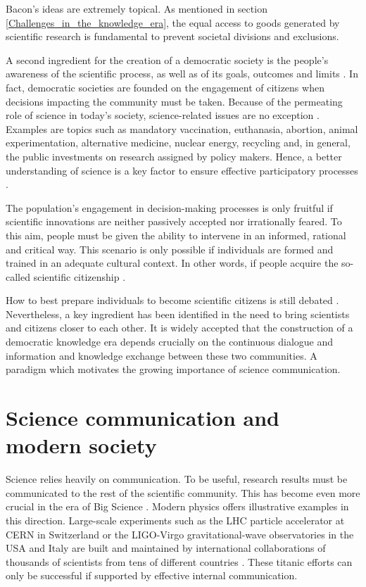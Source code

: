 Bacon's ideas are extremely topical. As mentioned in section \ref{Challenges_in_the_knowledge_era}, the equal access to goods generated by scientific research is fundamental to prevent societal divisions and exclusions.

A second ingredient for the creation of a democratic society is the people's awareness of the scientific process, as well as of its goals, outcomes and limits \cite{Gibbons}. In fact, democratic societies are founded on the engagement of citizens when decisions impacting the community must be taken. Because of the permeating role of science in today's society, science-related issues are no exception \cite{vanDijck}. Examples are topics such as mandatory vaccination, euthanasia, abortion, animal experimentation, alternative medicine, nuclear energy, recycling and, in general, the public investments on research assigned by policy makers. Hence, a better understanding of science is a key factor to ensure effective participatory processes \cite{Shapin}.    

The population's engagement in decision-making processes is only fruitful if scientific innovations are neither passively accepted nor irrationally feared. To this aim, people must be given the ability to intervene in an informed, rational and critical way. This scenario is only possible if individuals are formed and trained in an adequate cultural context. In other words, if people acquire the so-called scientific citizenship \cite{Arnason}.

How to best prepare individuals to become scientific citizens is still debated \cite{Nowotny}. Nevertheless, a key ingredient has been identified in the need to bring scientists and citizens closer to each other. It is widely accepted that the construction of a democratic knowledge era depends crucially on the continuous dialogue and information and knowledge exchange between these two communities. A paradigm which motivates the growing importance of science communication.

\section{Science communication and modern society} \label{Science_communication_and_modern_society}    
Science relies heavily on communication. To be useful, research results must be communicated to the rest of the scientific community. This has become even more crucial in the era of Big Science \cite{Galison}. Modern physics offers illustrative examples in this direction. Large-scale experiments such as the LHC particle accelerator at CERN in Switzerland or the LIGO-Virgo gravitational-wave observatories in the USA and Italy are built and maintained by international collaborations of thousands of scientists from tens of different countries \cite{CERN, LIGO, Virgo}. These titanic efforts can only be successful if supported by effective internal communication.  

